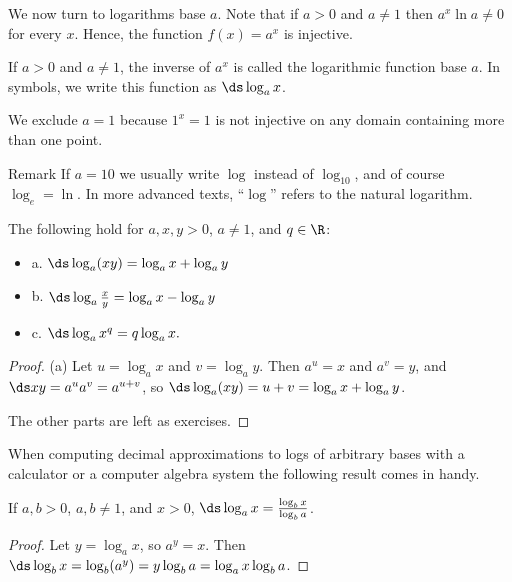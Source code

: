 \begin{theorem}
\begin{theorem}
\begin{theorem}
We now turn to logarithms base $a$. Note that if $a>0 $ and $a\neq 1 $
 then $a^x \ln a \neq 0 $ for every $x$. Hence, the function $f(x)
 =a^x $ is injective.

\begin{definition} If $a>0$ and $a\neq1$, the inverse of $a^x$ is called the
{\dfont logarithmic function base} $a$. In symbols, we write this
function as  $\ds \log _a x$.
\end{definition}

We exclude $a=1$ because $1^x = 1$ is not injective
on any domain containing more than one point.


\begin{remark}{Remark} If $a=10 $ we usually write $\log $ instead of $\log
_{10}$, and of course $\log _e =\ln$.
In more advanced texts,
``$\log $'' refers to the natural logarithm.
\end{remark}


\begin{theorem} The following hold for $a, x, y >0 $, $a\neq 1 $, and
$q\in \R$:
\label{thm:general log rules}

\begin{itemize} %

\item{a.} $\ds\log _a (xy) =\log _a x +\log _a y $

\item{b.} $\ds\log _a {x\over y} = \log _a x -\log _a y $

\item{c.} $\ds\log _a x^q = q\log _a x .$

\end{itemize}
\begin{proof}
(a) Let $u= \log_a x$ and $v= \log_a y$. Then $a^u =x $ and $a^v
= y$, and $\ds xy = a^u a^v = a^{u+v}$, so 
$\ds \log _a (xy) = u+v = \log_a x+\log_a y$.

 The other parts are left as exercises.
\end{proof}

 When computing decimal approximations to logs of
arbitrary bases with a calculator or a computer algebra system the
following result comes in handy.

\lem If $a, b>0 $, $a ,b \neq 1 $, and $x>0 $,
$\ds\log_a x = {\log_b  x\over \log_b a}$.
\begin{proof}
Let $y=\log_a x $, so $a^y = x$. Then
$\ds\log_b x = \log_b (a^y ) = y\log_b a =\log_a x \log _b a$.
\end{proof}


\end{theorem}
\end{theorem}
\end{theorem}
\end{theorem}
